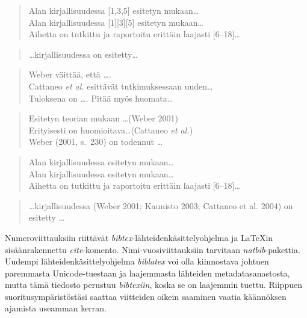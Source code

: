 \documentclass[globalnumbering,centeredcaptions,draftfooter]{tutthesis/tutthesis} %
\begin{document}
  \begin{quotation}
  Alan kirjallisuudessa [1,3,5] esitetyn mukaan\ldots\\
  Alan kirjallisuudessa [1][3][5] esitetyn mukaan\ldots\\
  Aihetta on tutkittu ja raportoitu erittäin laajasti [6--18]\ldots
  \end{quotation}
    
  \begin{quotation}
  \ldots kirjallisuudessa \citep{Weber2001,Kaunisto2003,Cattaneo2004} on esitetty\ldots
  \end{quotation}
\else
  \begin{quotation}
  Weber väittää, että \ldots \cite{Weber2001}.\\
  Cattaneo \emph{et al.} esittävät tutkimuksessaan \cite{Cattaneo2004} uuden\ldots\\
  Tuloksena on \ldots \cite[s.~23]{Weber2001}. Pitää myös huomata\ldots \cite[s.~33--36]{Weber2001}
  \end{quotation}

  \begin{quotation}
  Esitetyn teorian mukaan \ldots (Weber 2001)\\
  Erityisesti on huomioitava\ldots (Cattaneo \emph{et al.})\\
  Weber (2001, s.~230) on todennut \ldots
  \end{quotation}
    
  \begin{quotation}
  Alan kirjallisuudessa \cite{Weber2001,Cattaneo2004,Kaunisto2003} esitetyn mukaan\ldots\\
  Alan kirjallisuudessa \cite{Weber2001}\cite{Cattaneo2004}\cite{Kaunisto2003} esitetyn mukaan\ldots\\
  Aihetta on tutkittu ja raportoitu erittäin laajasti [6--18]\ldots %
  \end{quotation}
    
  \begin{quotation}
  \ldots kirjallisuudessa (Weber 2001; Kaunisto 2003; Cattaneo et al. 2004) on esitetty \ldots
  \end{quotation}
\fi

Numeroviittauksiin riittävät \emph{bibtex}-lähteidenkäsittelyohjelma ja LaTeXin sisäänrakennettu \emph{cite}-komento.
Nimi-vuosiviittauksiin tarvitaan \emph{natbib}-pakettia.
Uudempi lähteidenkäsittelyohjelma \emph{biblatex} voi olla kiinnostava johtuen paremmasta Unicode-tuestaan ja laajemmasta lähteiden metadatasanastosta, mutta tämä tiedosto perustuu \emph{bibtexiin}, koska se on laajemmin tuettu.
Riippuen suoritusympäristöstäsi saattaa viitteiden oikein saaminen vaatia käännöksen ajamista useamman kerran.
\end{document}
